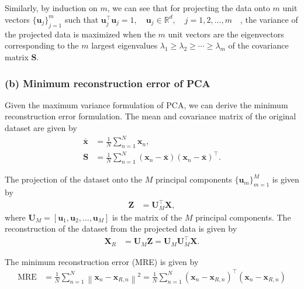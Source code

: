 Similarly, by induction on \( m \), we can see that for projecting the data onto \( m \) unit vectors \( {\{ \mathbf{u}_j \}}_{j=1}^{m} \) such that \( \mathbf{u}_j^\top \mathbf{u}_j = 1, \quad \mathbf{u}_j \in \mathbb{R}^d, \quad j = 1, 2, \dots, m \quad \), the variance of the projected data is maximized when the \( m \) unit vectors are the eigenvectors corresponding to the \( m \) largest eigenvalues \( \lambda_1 \geq \lambda_2 \geq \cdots \geq \lambda_m \) of the covariance matrix \( \mathbf{S} \).

\subsubsection*{(b) Minimum reconstruction error of PCA}

Given the maximum variance formulation of PCA, we can derive the minimum reconstruction error formulation.
The mean and covariance matrix of the original dataset are given by
\begin{align*}
    \bar{\mathbf{x}}
     & =
    \frac{1}{N} \sum_{n=1}^{N} \mathbf{x}_n,
    \\
    \mathbf{S}
     & =
    \frac{1}{N} \sum_{n=1}^{N} {(\mathbf{x}_n - \bar{\mathbf{x}})}{(\mathbf{x}_n - \bar{\mathbf{x}})^\top}.
\end{align*}

The projection of the dataset onto the \( M \) principal components \( {\{ \mathbf{u}_m \}}_{m=1}^{M} \) is given by
\begin{align*}
    \mathbf{Z}
     & =
    \mathbf{U}_M^\top \mathbf{X},
\end{align*}
where \( \mathbf{U}_M = [\mathbf{u}_1, \mathbf{u}_2, \dots, \mathbf{u}_M] \) is the matrix of the \( M \) principal components.
The reconstruction of the dataset from the projected data is given by
\begin{align*}
    \mathbf{X}_{R}
     & =
    \mathbf{U}_M \mathbf{Z}
    =
    \mathbf{U}_M \mathbf{U}_M^\top \mathbf{X}.
\end{align*}

The minimum reconstruction error (MRE) is given by
\begin{align*}
    \text{MRE}
     & =
    \frac{1}{N} \sum_{n=1}^{N} \left \| \mathbf{x}_n - \mathbf{x}_{R, n} \right \|^2
    =
    \frac{1}{N} \sum_{n=1}^{N} (\mathbf{x}_n - \mathbf{x}_{R, n} )^\top (\mathbf{x}_n - \mathbf{x}_{R, n})
\end{align*}
